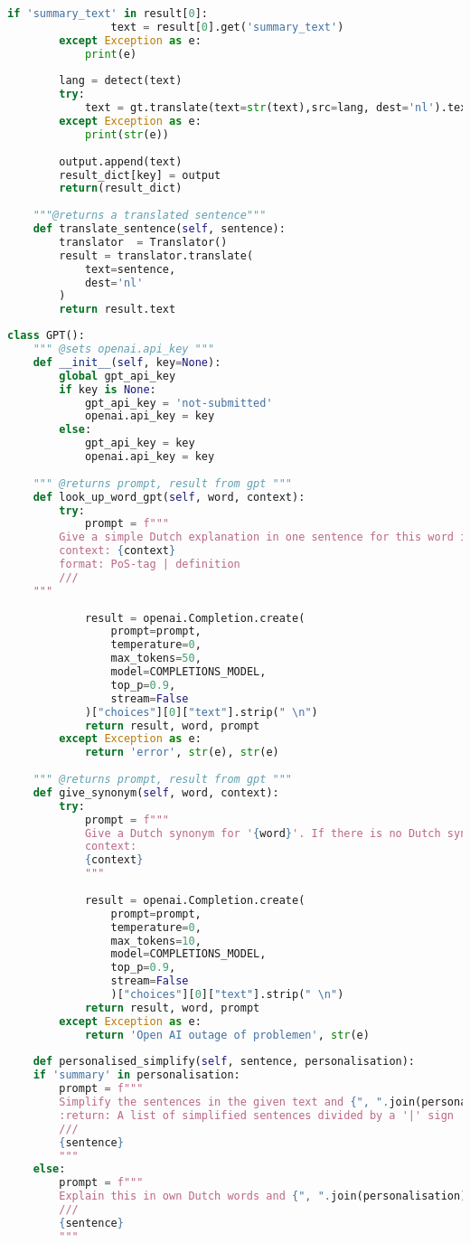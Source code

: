 \begin{lstlisting}[language=Python, caption={HuggingFace-klasse}, label={code:huggingface-klasse}]
			if 'summary_text' in result[0]:
				text = result[0].get('summary_text')
		except Exception as e:
			print(e)
	
		lang = detect(text)
		try:
			text = gt.translate(text=str(text),src=lang, dest='nl').text 
		except Exception as e:
			print(str(e))
		
		output.append(text)
		result_dict[key] = output
		return(result_dict)            
	
	"""@returns a translated sentence"""
	def translate_sentence(self, sentence):
		translator  = Translator()
		result = translator.translate(
			text=sentence,
			dest='nl'
		)
		return result.text
\end{lstlisting}

\begin{lstlisting}[language=Python, caption={Reader-klasse}, label={code:reader-klasse}]
class GPT():
	""" @sets openai.api_key """
	def __init__(self, key=None):
		global gpt_api_key
		if key is None:
			gpt_api_key = 'not-submitted'
			openai.api_key = key
		else:
			gpt_api_key = key
			openai.api_key = key
	
	""" @returns prompt, result from gpt """
	def look_up_word_gpt(self, word, context):
		try:
			prompt = f"""
		Give a simple Dutch explanation in one sentence for this word in the given context. Give the PoS-tag and Dutch definition: '{word}'
		context: {context}
		format: PoS-tag | definition
		///
	"""
	
			result = openai.Completion.create(
				prompt=prompt,
				temperature=0,
				max_tokens=50,
				model=COMPLETIONS_MODEL,
				top_p=0.9,
				stream=False
			)["choices"][0]["text"].strip(" \n")    
			return result, word, prompt	
		except Exception as e:
			return 'error', str(e), str(e)
	
	""" @returns prompt, result from gpt """
	def give_synonym(self, word, context):
		try:
			prompt = f"""
			Give a Dutch synonym for '{word}'. If there is no Dutch synonym available, explain it between curly brackets.
			context:
			{context}
			"""
			
			result = openai.Completion.create(
				prompt=prompt,
				temperature=0,
				max_tokens=10,
				model=COMPLETIONS_MODEL,
				top_p=0.9,
				stream=False
				)["choices"][0]["text"].strip(" \n")    
			return result, word, prompt
		except Exception as e:
			return 'Open AI outage of problemen', str(e)
		
	def personalised_simplify(self, sentence, personalisation):
	if 'summary' in personalisation:
		prompt = f"""
		Simplify the sentences in the given text and {", ".join(personalisation)}
		:return: A list of simplified sentences divided by a '|' sign
		///
		{sentence}
		"""
	else:
		prompt = f"""
		Explain this in own Dutch words and {", ".join(personalisation)}
		///
		{sentence}
		"""
	

\end{lstlisting}
